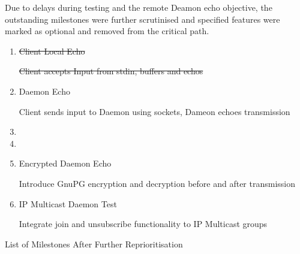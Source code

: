 Due to delays during testing and the remote Deamon echo objective, the 
outstanding milestones were further scrutinised and specified features
were marked as optional and removed from the critical path.


\begin{table}[Hbt]

\begin{center}

\begin{enumerate}

\item \sout{Client Local Echo}

	\subitem \sout{Client accepts Input from stdin, buffers and echos}

\item Daemon Echo 

	\subitem Client sends input to Daemon using sockets, Dameon 
	echoes transmission

\item {}

	\subitem {}

\item {}

	\subitem {}

\item Encrypted Daemon Echo 

	\subitem Introduce GnuPG encryption and decryption before and after 
	transmission 

\item IP Multicast Daemon Test

	\subitem Integrate join and unsubscribe functionality to IP Multicast
	groups

\end{enumerate}

\end{center}

\caption{List of Milestones After Further Reprioritisation}

\end{table}
